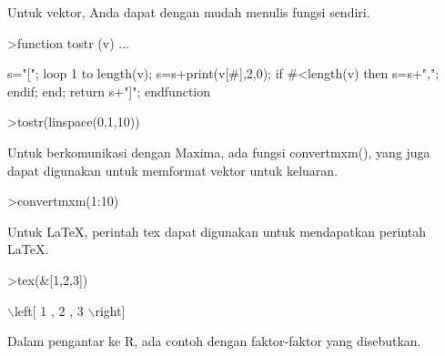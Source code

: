 \documentclass[a4paper,10pt]{article}
\begin{document}
\begin{eulernotebook}
\begin{eulercomment}
\begin{eulercomment}
\begin{eulercomment}
\begin{eulercomment}
\begin{eulercomment}
Untuk vektor, Anda dapat dengan mudah menulis fungsi sendiri.
\end{eulercomment}
\begin{eulerprompt}
>function tostr (v) ...
\end{eulerprompt}
\begin{eulerudf}
  s="[";
  loop 1 to length(v);
     s=s+print(v[#],2,0);
     if #<length(v) then s=s+","; endif;
  end;
  return s+"]";
  endfunction
\end{eulerudf}
\begin{eulerprompt}
>tostr(linspace(0,1,10))
\end{eulerprompt}
\begin{euleroutput}
  [0.00,0.10,0.20,0.30,0.40,0.50,0.60,0.70,0.80,0.90,1.00]
\end{euleroutput}
\begin{eulercomment}
Untuk berkomunikasi dengan Maxima, ada fungsi convertmxm(), yang juga
dapat digunakan untuk memformat vektor untuk keluaran.
\end{eulercomment}
\begin{eulerprompt}
>convertmxm(1:10)
\end{eulerprompt}
\begin{euleroutput}
  [1,2,3,4,5,6,7,8,9,10]
\end{euleroutput}
\begin{eulercomment}
Untuk LaTeX, perintah tex dapat digunakan untuk mendapatkan perintah
LaTeX.
\end{eulercomment}
\begin{eulerprompt}
>tex(&[1,2,3])
\end{eulerprompt}
\begin{euleroutput}
  \(\backslash\)left[ 1 , 2 , 3 \(\backslash\)right] 
\end{euleroutput}
\begin{eulercomment}
Dalam pengantar ke R, ada contoh dengan faktor-faktor yang disebutkan.


\end{eulercomment}
\end{eulercomment}
\end{eulercomment}
\end{eulercomment}
\end{eulercomment}
\end{eulernotebook}
\end{document}
